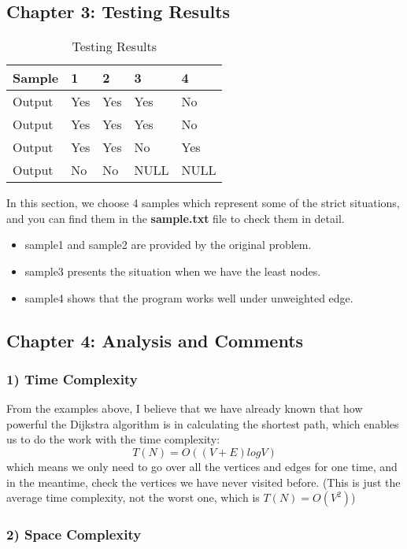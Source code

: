 \documentclass{article}
\begin{document}
\subsection*{\bf Chapter 3: Testing Results}
\begin{table}[!ht]
    \centering
    \caption{Testing Results}
    \begin{tabular}{|l|llll|}
    \hline
        Sample & 1 & 2 & 3 & 4 \\ \hline
        Output & Yes & Yes & Yes & No \\ 
        Output & Yes & Yes & Yes & No \\ 
        Output & Yes & Yes & No & Yes \\ 
        Output & No & No & NULL & NULL \\ \hline
    \end{tabular}
\end{table}
In this section, we choose 4 samples which represent some of the strict
 situations, and you can find them in the {\bf sample.txt} file to check them in
 detail.
 \begin{itemize}
     \item sample1 and sample2 are provided by the original problem.
     \item sample3 presents the situation when we have the least nodes.
     \item sample4 shows that the program works well under unweighted edge.
 \end{itemize}
\subsection*{\bf Chapter 4: Analysis and Comments}

\subsubsection*{1) Time Complexity}

From the examples above, I believe that we have already known that how powerful the Dijkstra algorithm is in calculating the shortest path, which enables us to do the work with the time complexity:$$T(N)=O((V+E)logV)$$
which means we only need to go over all the vertices and edges for one time, and in the meantime, check the vertices we have never visited before. (This is just the average time complexity, not the worst one, which is $T(N)=O(V^2)$)

\subsubsection*{2) Space Complexity}
\end{document}
